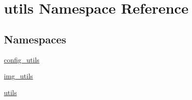 \hypertarget{namespaceutils}{}\section{utils Namespace Reference}
\label{namespaceutils}
\subsection*{Namespaces}
\begin{DoxyCompactItemize}
\item 
 \mbox{\hyperlink{namespaceutils_1_1config__utils}{config\+\_\+utils}}
\item 
 \mbox{\hyperlink{namespaceutils_1_1img__utils}{img\+\_\+utils}}
\item 
 \mbox{\hyperlink{namespaceutils_1_1utils}{utils}}
\end{DoxyCompactItemize}
